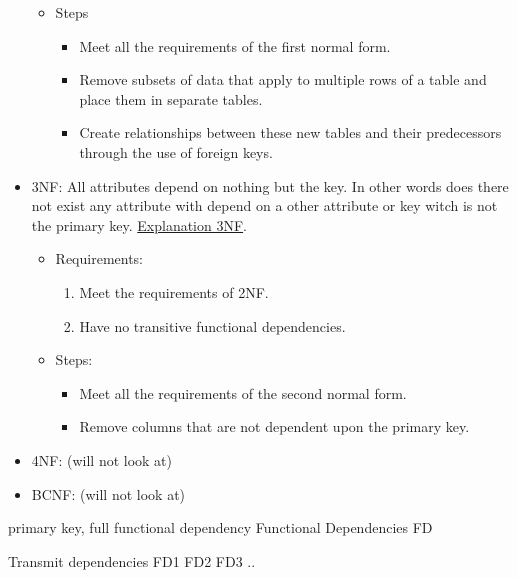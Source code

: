 \begin{multicols}{2}
\begin{itemize}
\begin{itemize}
\begin{enumerate}
        \end{enumerate}
        \item Steps
        \begin{itemize}
            \item Meet all the requirements of the first normal form.
            \item Remove subsets of data that apply to multiple rows of a table and place them in separate tables.
            \item Create relationships between these new tables and their predecessors through the use of foreign keys.
        \end{itemize}
    \end{itemize}
    \item 3NF: All attributes depend on nothing but the key. In other words 
    does there not exist any attribute with depend on a other attribute or key
    witch is not the primary key.
    \href{https://www.youtube.com/watch?v=aAx_JoEDXQA}{Explanation 3NF}.
    \begin{itemize}
        \item Requirements:
        \begin{enumerate}
            \item Meet the requirements of 2NF.
            \item Have no transitive functional dependencies.
        \end{enumerate}
        \item Steps:
        \begin{itemize}
            \item Meet all the requirements of the second normal form.
            \item Remove columns that are not dependent upon the primary key.
        \end{itemize}
    \end{itemize}
    \item 4NF: (will not look at)
    \item BCNF: (will not look at)
\end{itemize}

primary key, full functional dependency
Functional Dependencies FD

Transmit dependencies FD1 FD2 FD3 ..


\end{multicols}
